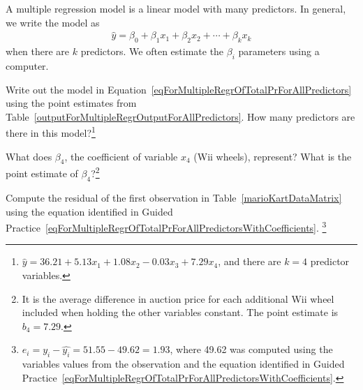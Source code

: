 \begin{termBox}{
A multiple regression model is a linear model with many predictors. In general, we write the model as
\begin{align*}
\hat{y} = \beta_0 + \beta_1 x_1 + \beta_2 x_2 + \cdots + \beta_k x_k %
\end{align*}
when there are $k$ predictors. We often estimate the $\beta_i$ parameters using a computer.\vspace{1mm}}
\end{termBox}

\begin{exercise} \label{eqForMultipleRegrOfTotalPrForAllPredictorsWithCoefficients}
Write out the model in Equation~\eqref{eqForMultipleRegrOfTotalPrForAllPredictors} using the point estimates from Table~\ref{outputForMultipleRegrOutputForAllPredictors}. How many predictors are there in this model?\footnote{$\hat{y} = 36.21 + 5.13x_1 + 1.08x_2 - 0.03x_3 + 7.29x_4$, and there are $k=4$ predictor variables.}
\end{exercise}

\begin{exercise}
What does $\beta_4$, the coefficient of variable $x_4$ (Wii wheels), represent? What is the point estimate of $\beta_4$?\footnote{It is the average difference in auction price for each additional Wii wheel included when holding the other variables constant. The point estimate is $b_4 = 7.29$.}
\end{exercise}

\begin{exercise} \label{computeMultipleRegressionResidualForMarioKart}
Compute the residual of the first observation in Table~\vref{marioKartDataMatrix} using the equation identified in Guided Practice~\ref{eqForMultipleRegrOfTotalPrForAllPredictorsWithCoefficients}. \footnote{$e_i = y_i - \hat{y_i} = 51.55 - 49.62 = 1.93$, where 49.62 was computed using the variables values from the observation and the equation identified in Guided Practice~\ref{eqForMultipleRegrOfTotalPrForAllPredictorsWithCoefficients}.}
\end{exercise}

\textB{\pagebreak}

